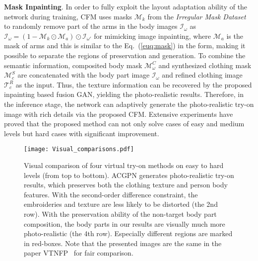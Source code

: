 \documentclass[10pt,twocolumn,letterpaper]{article}
\begin{document}
\textbf{Mask Inpainting}. In order to fully exploit the layout adaptation ability of the network during training, CFM uses masks $\mathcal{M}_k$ from the \emph{Irregular Mask Dataset}~\cite{liu2018image} to randomly remove part of the arms in the body images $\mathcal{I}_{\omega}$ as $\mathcal{I}_{\omega}=(1-\mathcal{M}_k \odot \mathcal{M}_a)\odot \mathcal{I}_{\omega'}$  for mimicking image inpainting, where $\mathcal{M}_a$ is the mask of arms and this is similar to the Eq.~(\ref{euq:mask}) in the form, making it possible to separate the regions of preservation and generation. To combine the semantic information, composited body mask $\mathcal{M}^{C}_{\omega}$ and synthesized clothing mask $\mathcal{M}^{S}_{c}$ are concatenated with the body part image $\mathcal{I}_{\omega}$ and refined clothing  image $\mathcal{T}^{R}_{c}$ as the input.
Thus, the texture information can be recovered by the proposed inpainting based fusion GAN, yielding the photo-realistic results. Therefore,
in the inference stage, the network can adaptively generate the photo-realistic try-on image with rich details via the proposed CFM. Extensive experiments have proved that the proposed method can not only solve cases of easy and medium levels but hard cases with significant improvement.








\begin{figure*}[t]
\begin{center}
\texttt{[image: Visual\_comparisons.pdf]}
\vspace{-10pt}
\end{center}
   \caption{\footnotesize Visual comparison of four virtual try-on methods on easy to hard levels (from top to bottom). ACGPN generates photo-realistic try-on results, which preserves both
the clothing texture and person body features. With the second-order difference constraint, the embroideries and texture are less likely to be distorted (\ie the 2nd row). With the preservation ability of the non-target body part composition, the body parts in our results are visually much more photo-realistic (\ie the 4th row). Especially different regions are marked in red-boxes. Note that the presented images are the same in the paper VTNFP~\cite{Yu_2019_ICCV} for fair comparison.}
\label{fig:Comparison}
\vspace{-10pt}
\end{figure*}
\end{document}
